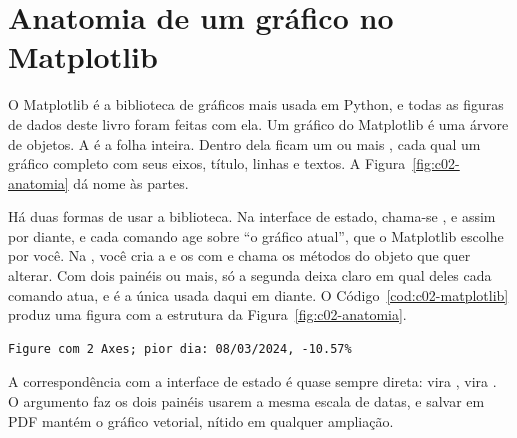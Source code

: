 \section{Anatomia de um gráfico no Matplotlib}
\label{sec:c02-matplotlib}

O Matplotlib \citep{hunter2007} é a biblioteca de gráficos mais usada em Python, e todas as figuras de dados deste livro foram feitas com ela. Um gráfico do Matplotlib é uma árvore de objetos. A  é a folha inteira. Dentro dela ficam um ou mais , cada qual um gráfico completo com seus eixos, título, linhas e textos. A Figura~\ref{fig:c02-anatomia} dá nome às partes.

Há duas formas de usar a biblioteca. Na interface de estado, chama-se ,  e assim por diante, e cada comando age sobre ``o gráfico atual'', que o Matplotlib escolhe por você. Na , você cria a  e os  com  e chama os métodos do objeto que quer alterar. Com dois painéis ou mais, só a segunda deixa claro em qual deles cada comando atua, e é a única usada daqui em diante. O Código~\ref{cod:c02-matplotlib} produz uma figura com a estrutura da Figura~\ref{fig:c02-anatomia}.


\begin{lstlisting}[style=saida]
Figure com 2 Axes; pior dia: 08/03/2024, -10.57%
\end{lstlisting}


A correspondência com a interface de estado é quase sempre direta:  vira ,  vira . O argumento  faz os dois painéis usarem a mesma escala de datas, e salvar em PDF mantém o gráfico vetorial, nítido em qualquer ampliação.

